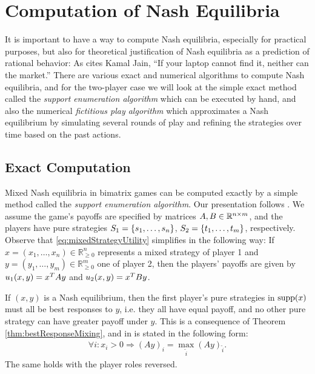 \documentclass[a4paper,DIV=11,abstracton,twoside=semi]{scrreprt}
\newcommand{\Rp}{\mathbb{R}_{\geq 0}}
\theoremstyle{definition}
\begin{document}
    
    \section{Computation of Nash Equilibria}
    It is important to have a way to compute Nash equilibria, especially for practical purposes, but also for theoretical justification of Nash equilibria as a prediction of rational behavior: As \cite[p.30]{bib:nisanAlgorithmicGameTheoryCh2ComplexityNash} cites Kamal Jain, “If your laptop cannot
find it, neither can the market.” There are various exact and numerical algorithms to compute Nash equilibria, and for the two-player case we will look at the simple exact method called the \emph{support enumeration algorithm} which can be executed by hand, and also the numerical \emph{fictitious play algorithm} which approximates a Nash equilibrium by simulating several rounds of play and refining the strategies over time based on the past actions.
    
    \subsection{Exact Computation}
    \label{subsec:exactComputationNashEquilibriaSupportEnumerationAlgorithm}
    Mixed Nash equilibria in bimatrix games can be computed exactly by a simple method called the \emph{support enumeration algorithm}.
    Our presentation follows \cite{bib:nisanAlgorithmicGameTheoryCh3EquilibriumComputation}.
    We assume the game's payoffs are specified by matrices $A, B \in \mathbb{R}^{n\times m}$, and the players have pure strategies $S_1 = \{s_1,\dots,s_n\}$, $S_2 = \{t_1,\dots,t_m\}$, respectively.
    Observe that \eqref{eq:mixedStrategyUtility} simplifies in the following way: If $x = (x_1,\dots,x_n) \in \Rp^n$ represents a mixed strategy of player 1 and $y = (y_1,\dots,y_m) \in \Rp^m$ one of player 2, then the players' payoffs are given by $u_1(x,y) = x^{T} A y$ and $u_2(x,y) = x^{T} B y$.
    
    If $(x, y)$ is a Nash equilibrium, then the first player's pure strategies in $\operatorname{supp}(x)$ must all be best responses to $y$, i.e. they all have equal payoff, and no other pure strategy can have greater payoff under $y$. This is a consequence of Theorem \ref{thm:bestResponseMixing}, and in \cite[p.55]{bib:nisanAlgorithmicGameTheoryCh3EquilibriumComputation} is stated in the following form:
    \begin{gather}
        \forall i: x_i > 0 \Rightarrow (Ay)_i = \max_{\tilde{i}} (Ay)_{\tilde{i}}.
        \label{eq:equalMaxPureStrategyPayoffsLinearSystem}
    \end{gather}
    The same holds with the player roles reversed.
    
\end{document}
